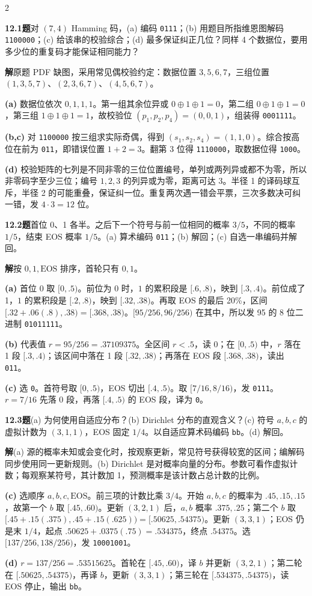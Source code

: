 \documentclass[a4paper]{article}
\newcommand{\cols}{2}
\newcommand{\cols}{4}
\newcommand{\topic}[1]{\par\addvspace{2.6pt}{\color{ink}\bfseries #1}\par\nobreak}
\newcommand{\problem}[2]{\par\addvspace{1.4pt}\textcolor{ink}{\textbf{#1}}\enspace\textbf{题}\enspace #2\par\nobreak}
\newcommand{\solve}{\noindent\textbf{解}\enspace}
\newcommand{\parta}[1]{\par\noindent\textbf{(#1)}\enspace}
\newcommand{\bb}[1]{\texttt{#1}}
\newcommand{\code}{\mathrm{EOS}}
\begin{document}
\begin{multicols}{\cols}
\topic{Tut 12 · Hamming 与算术编码}
\problem{12.1}{对 $(7,4)$ Hamming 码，(a) 编码 \bb{0111}；(b) 用题目所指维恩图解码 \bb{1100000}；(c) 给该串的校验综合；(d) 最多保证纠正几位？同样 4 个数据位，要用多少位的重复码才能保证相同能力？}
\solve 原题 PDF 缺图，采用常见偶校验约定：数据位置 $3,5,6,7$，三组位置 $(1,3,5,7)$、$(2,3,6,7)$、$(4,5,6,7)$。
\parta{a} 数据位依次 $0,1,1,1$。第一组其余位异或 $0\oplus1\oplus1=0$，第二组 $0\oplus1\oplus1=0$，第三组 $1\oplus1\oplus1=1$，故校验位 $(p_1,p_2,p_4)=(0,0,1)$，组装得 \bb{0001111}。
\parta{b,c} 对 \bb{1100000} 按三组求实际奇偶，得到 $(s_1,s_2,s_4)=(1,1,0)$。综合按高位在前为 \bb{011}，即错误位置 $1+2=3$。翻第 3 位得 \bb{1110000}，取数据位得 \bb{1000}。
\parta{d} 校验矩阵的七列是不同非零的三位位置编号，单列或两列异或都不为零，所以非零码字至少三位；编号 $1,2,3$ 的列异或为零，距离可达 3。半径 1 的译码球互斥，半径 2 的可能重叠，保证纠一位。重复两次遇一错会平票，三次多数决可纠一错，发 $4\cdot3=12$ 位。
\problem{12.2}{首位 0、1 各半。之后下一个符号与前一位相同的概率 $3/5$，不同的概率 $1/5$，结束 EOS 概率 $1/5$。(a) 算术编码 \bb{011}；(b) 解回；(c) 自选一串编码并解回。}
\solve 按 $0,1,\code$ 排序，首轮只有 $0,1$。
\parta{a} 首位 $0$ 取 $[0,.5)$。前位为 0 时，$1$ 的累积段是 $[.6,.8)$，映到 $[.3,.4)$。前位成了 1，$1$ 的累积段是 $[.2,.8)$，映到 $[.32,.38)$。再取 EOS 的最后 20\%，区间 $[.32+.06(.8),.38)=[.368,.38)$。$[95/256,96/256)$ 在其中，所以发 95 的 8 位二进制 \bb{01011111}。
\parta{b} 代表值 $r=95/256=.37109375$。全区间 $r<.5$，读 0；在 $[0,.5)$ 中，$r$ 落在 1 段 $[.3,.4)$；该区间中落在 1 段 $[.32,.38)$；再落在 EOS 段 $[.368,.38)$，读出 \bb{011}。
\parta{c} 选 \bb{0}。首符号取 $[0,.5)$，EOS 切出 $[.4,.5)$。取 $[7/16,8/16)$，发 \bb{0111}。$r=7/16$ 先落 0 段，再落 $[.4,.5)$ 的 EOS 段，译为 \bb{0}。
\problem{12.3}{(a) 为何使用自适应分布？(b) Dirichlet 分布的直观含义？(c) 符号 $a,b,c$ 的虚拟计数为 $(3,1,1)$，EOS 固定 $1/4$。以自适应算术码编码 \bb{bb}。(d) 解回。}
\solve (a) 源的概率未知或会变化时，按观察更新，常见符号获得较宽的区间；编解码同步使用同一更新规则。(b) Dirichlet 是对概率向量的分布。参数可看作虚拟计数；每观察某符号，其计数加 1，预测概率是该计数占总计数的比例。
\parta{c} 选顺序 $a,b,c,\code$。前三项的计数比乘 $3/4$。开始 $a,b,c$ 的概率为 $.45,.15,.15$，故第一个 $b$ 取 $[.45,.60)$。更新 $(3,2,1)$ 后，$a,b$ 概率 $.375,.25$；第二个 $b$ 取 $[.45+.15(.375),.45+.15(.625))=[.50625,.54375)$。更新 $(3,3,1)$；EOS 仍是末 $1/4$，起点 $.50625+.0375(.75)=.534375$，终点 $.54375$。选 $[137/256,138/256)$，发 \bb{10001001}。
\parta{d} $r=137/256=.53515625$。首轮在 $[.45,.60)$，译 $b$ 并更新 $(3,2,1)$；第二轮在 $[.50625,.54375)$，再译 $b$，更新 $(3,3,1)$；第三轮在 $[.534375,.54375)$，读 EOS 停止，输出 \bb{bb}。
\end{multicols}
\end{document}
